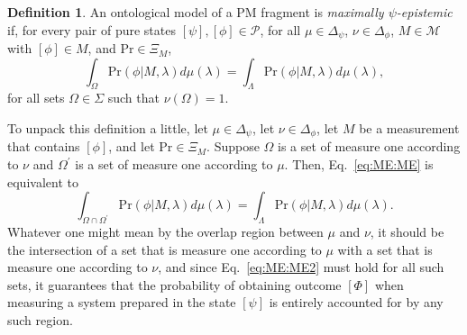 \documentclass[DIV=calc,fontsize=12pt]{scrartcl} %
\theoremstyle{definition}
\newtheorem{definition}{Definition}[section]
\theoremstyle{plain}
\newcommand{\Proj}[1]{\ensuremath{\left [ #1 \right ]}}
\begin{document}
\begin{definition}
\label{def:ME:ME}
An ontological model of a PM fragment is \emph{maximally
$\psi$-epistemic} if, for every pair of pure states $\Proj{\psi},
\Proj{\phi} \in \mathcal{P}$, for all $\mu \in \Delta_{\psi}$, $\nu
\in \Delta_{\phi}$, $M \in \mathcal{M}$ with $\Proj{\phi} \in M$,
and $\text{Pr} \in \Xi_M$,
\begin{equation}
\label{eq:ME:ME}
\int_{\Omega} \text{Pr}(\phi|M,\lambda) d\mu(\lambda) =
\int_{\Lambda} \text{Pr}(\phi|M,\lambda) d\mu(\lambda),
\end{equation}
for all sets $\Omega \in \Sigma$ such that $\nu(\Omega) = 1$.
\end{definition}

To unpack this definition a little, let $\mu \in \Delta_{\psi}$, let
$\nu \in \Delta_{\phi}$, let $M$ be a measurement that contains
$\Proj{\phi}$, and let $\text{Pr} \in \Xi_M$.  Suppose $\Omega$ is a
set of measure one according to $\nu$ and $\Omega^{\prime}$ is a set
of measure one according to $\mu$.  Then, Eq.~\eqref{eq:ME:ME} is
equivalent to
\begin{equation}
\label{eq:ME:ME2}
\int_{\Omega \cap \Omega^{\prime}} \text{Pr}(\phi|M,\lambda) d\mu(\lambda) =
\int_{\Lambda} \text{Pr}(\phi|M,\lambda) d\mu(\lambda).
\end{equation}
Whatever one might mean by the overlap region between $\mu$ and $\nu$,
it should be the intersection of a set that is measure one according
to $\mu$ with a set that is measure one according to $\nu$, and since
Eq.~\eqref{eq:ME:ME2} must hold for all such sets, it guarantees that
the probability of obtaining outcome $\Proj{\Phi}$ when measuring a
system prepared in the state $\Proj{\psi}$ is entirely accounted for
by any such region.
\end{document}
